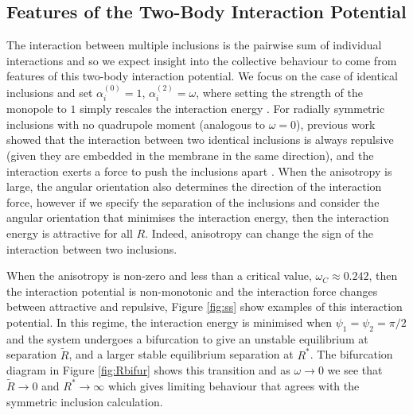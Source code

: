 \subsection{Features of the Two-Body Interaction Potential}

The interaction between multiple inclusions is the pairwise sum of individual interactions and so we expect insight into the collective behaviour to come from features of this two-body interaction potential. We focus on the case of identical inclusions and set $\alpha_i^{(0)}=1$, $\alpha_i^{(2)}=\omega$, where setting the strength of the monopole to $1$ simply rescales the interaction energy . For radially symmetric inclusions with no quadrupole moment (analogous to $\omega=0$), previous work showed that the interaction between two identical inclusions is always repulsive (given they are embedded in the membrane in the same direction), and the interaction exerts a force to push the inclusions apart \cite{weikl_interaction_1998}. When the anisotropy is large, the angular orientation also determines the direction of the interaction force, however if we specify the separation of the inclusions and consider the angular orientation that minimises the interaction energy, then the interaction energy is attractive for all $R$. Indeed, anisotropy can change the sign of the interaction between two inclusions.

When the anisotropy is non-zero and less than a critical value, $\omega_C\approx 0.242$, then the interaction potential is non-monotonic and the interaction force changes between attractive and repulsive, Figure \ref{fig:ss} show examples of this interaction potential. In this regime, the interaction energy is minimised when $\psi_1=\psi_2=\pi/2$ and the system undergoes a bifurcation to give an unstable equilibrium at separation $\tilde{R}$, and a larger stable equilibrium separation at $R^*$. The bifurcation diagram in Figure \ref{fig:Rbifur} shows this transition and as $\omega\to0$ we see that $\tilde{R}\to 0$ and $R^*\to \infty$ which gives limiting behaviour that agrees with the symmetric inclusion calculation. 

